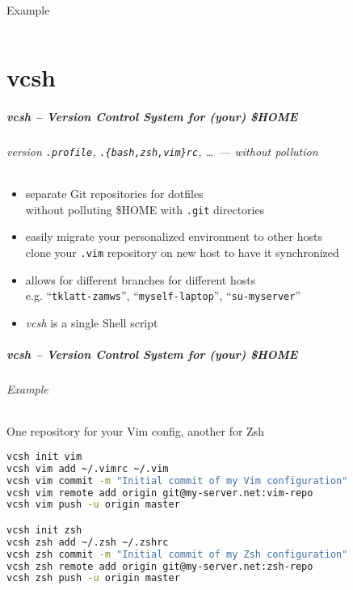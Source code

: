 \documentclass[english,hyperref={pdfpagelabels=false},aspectratio=169]{beamer}
\begin{document}
\begin{frame}[fragile]
  \frametitle{}
  \begin{block}{Example}
    \vspace{-0.75em}
    \begin{lstlisting}

    \end{lstlisting}
    \vspace{-0.75em}
  \end{block}
\end{frame}


\part{vcsh}
\makepart

\begin{frame}[label=vcsh]
  \frametitle{vcsh -- Version Control System for (your) \$HOME}
  \framesubtitle{version \texttt{.profile}, \texttt{.\{bash,zsh,vim\}rc}, \dots~--- without pollution}
  \begin{itemize}
    \item separate Git repositories for dotfiles\\
      {\scriptsize without polluting \$HOME with \texttt{.git} directories}
    \item easily migrate your personalized environment to other hosts\\
      {\scriptsize clone your \texttt{.vim} repository on new host to have it synchronized}
    \item allows for different branches for different hosts\\
      {\scriptsize e.g. ``\texttt{tklatt-zamws}'', ``\texttt{myself-laptop}'', ``\texttt{su-myserver}''}
    \item \textit{vcsh} is a single Shell script
  \end{itemize}
\end{frame}

\begin{frame}[fragile]
  \frametitle{vcsh -- Version Control System for (your) \$HOME}
  \framesubtitle{Example}
  \begin{block}{One repository for your Vim config, another for Zsh}
    \vspace{-0.75em}
    \begin{lstlisting}[language=zsh]
vcsh init vim
vcsh vim add ~/.vimrc ~/.vim
vcsh vim commit -m "Initial commit of my Vim configuration"
vcsh vim remote add origin git@my-server.net:vim-repo
vcsh vim push -u origin master

vcsh init zsh
vcsh zsh add ~/.zsh ~/.zshrc
vcsh zsh commit -m "Initial commit of my Zsh configuration"
vcsh zsh remote add origin git@my-server.net:zsh-repo
vcsh zsh push -u origin master
    \end{lstlisting}
    \vspace{-0.75em}
  \end{block}
\end{frame}
\end{document}
